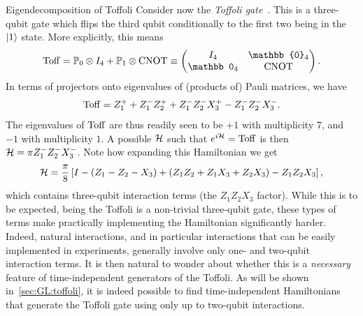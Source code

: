 \begin{examplebox}[label={ex:GL:eigendecomposition_Toffoli}]{Eigendecomposition of Toffoli}
\fontsize{10pt}{10pt}\selectfont
Consider now the \emph{Toffoli gate}~\cite{shi2002both,lanyon2008simplifying,monz2009realization,fedorov2011implementation,shi2018deutsch}. This is a three-qubit gate which flips the third qubit conditionally to the first two being in the $\ket1$ state.
More explicitly, this means
\begin{equation}
    \Toff =
    \PP_0\otimes I_4 + \PP_1\otimes\CNOT
    \equiv
    \begin{pmatrix}
        I_4 & \mathbb{0}_4 \\
        \mathbb 0_4 & \CNOT
    \end{pmatrix}.
\end{equation}
In terms of projectors onto eigenvalues of (products of) Pauli matrices, we have
\begin{equation}
    \operatorname{Toff} = Z_1^+ + Z_1^- Z_2^+ + Z_1^- Z_2^- X_3^+ - Z_1^- Z_2^- X_3^-.
\end{equation}
The eigenvalues of $\operatorname{Toff}$ are thus readily seen to be $+1$ with multiplicity $7$, and $-1$ with multiplicity $1$.
A possible ${\mathcal{H}}$ such that $e^{i{\mathcal{H}}}=\operatorname{Toff}$ is then ${\mathcal{H}}=\pi Z_1^- Z_2^- X_3^-$.
Note how expanding this Hamiltonian we get
\begin{equation}
    {\mathcal{H}} = \frac{\pi}{8}\left[
        I - (Z_1 - Z_2 - X_3)
        + (Z_1 Z_2 + Z_1 X_3 + Z_2 X_3)
        - Z_1 Z_2 X_3
    \right],
\end{equation}
which contains three-qubit interaction terms (the $Z_1 Z_2 X_3$ factor). While this is to be expected, being the Toffoli is a non-trivial three-qubit gate, these types of terms make practically implementing the Hamiltonian significantly harder.
Indeed, natural interactions, and in particular interactions that can be easily implemented in experiments, generally involve only one- and two-qubit interaction terms.
It is then natural to wonder about whether this is a \emph{necessary} feature of time-independent generators of the Toffoli.
As will be shown in~\cref{sec:GL:toffoli}, it is indeed possible to find time-independent Hamiltonians that generate the Toffoli gate using only up to two-qubit interactions.
\end{examplebox}

